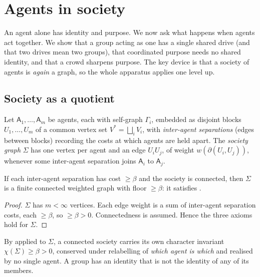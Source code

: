 \documentclass[11pt,twocolumn,a4paper]{article}
\newcommand{\Agent}{\mathsf{A}}
\newcommand{\Self}{\Gamma}          %
\newcommand{\V}{V}
\newcommand{\wt}{w}
\newcommand{\floorc}{\beta}          %
\newcommand{\cut}{\partial}
\newcommand{\Char}{\chi}             %
\newcommand{\Soc}{\Sigma}            %
\begin{document}
\section{Agents in society}
\label{sec:society}

An agent alone has identity and purpose. We now ask what happens when
agents act together. We show that a group acting as one has a single
shared drive (and that two drives mean two groups), that coordinated
purpose needs no shared identity, and that a crowd sharpens purpose. The
key device is that a society of agents is \emph{again} a graph, so the
whole apparatus applies one level up.

\subsection{Society as a quotient}

\begin{definition}
\label{def:society}
Let $\Agent_1,\dots,\Agent_m$ be agents, each with self-graph $\Self_i$,
embedded as disjoint blocks $U_1,\dots,U_m$ of a common vertex set
$\V^\ast=\bigsqcup_i\V_i$, with \emph{inter-agent separations} (edges
between blocks) recording the costs at which agents are held apart. The
\emph{society graph} $\Soc$ has one vertex per agent and an edge
$U_iU_j$, of weight $\wt(\cut(U_i,U_j))$, whenever some inter-agent
separation joins $\Agent_i$ to $\Agent_j$.
\end{definition}

\begin{lemma}
\label{lem:society-graph}
If each inter-agent separation has cost $\ge\floorc$ and the society is
connected, then $\Soc$ is a finite connected weighted graph with floor
$\ge\floorc$: it satisfies .
\end{lemma}

\begin{proof}
$\Soc$ has $m<\infty$ vertices. Each edge weight is a sum of inter-agent
separation costs, each $\ge\floorc$, so $\ge\floorc>0$. Connectedness is
assumed. Hence the three axioms hold for $\Soc$.
\end{proof}

\begin{corollary}
\label{cor:society-identity}
By  applied to $\Soc$, a connected society carries its
own character invariant $\Char(\Soc)\ge\floorc>0$, conserved under
relabelling of \emph{which agent is which} and realised by no single
agent. A group has an identity that is not the identity of any of its
members.
\end{corollary}
\end{document}

